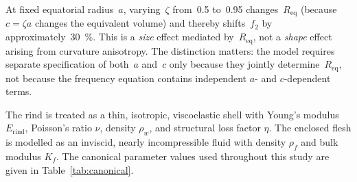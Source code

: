 At fixed equatorial radius~$a$, varying~$\zeta$ from~0.5 to~0.95
changes~$R_{\mathrm{eq}}$ (because $c = \zeta a$ changes the
equivalent volume) and thereby shifts~$f_2$ by
approximately~\SI{30}{\percent}.  This is a \emph{size} effect
mediated by~$R_{\mathrm{eq}}$, not a \emph{shape} effect arising
from curvature anisotropy.  The distinction matters: the model
requires separate specification of both~$a$ and~$c$ only because
they jointly determine~$R_{\mathrm{eq}}$, not because the frequency
equation contains independent $a$- and $c$-dependent terms.

The rind is treated as a thin, isotropic, viscoelastic shell with Young's
modulus $E_{\mathrm{rind}}$, Poisson's ratio $\nu$, density
$\rho_w$, and structural loss factor $\eta$.  The enclosed flesh is
modelled as an inviscid, nearly incompressible fluid with density
$\rho_f$ and bulk modulus $K_f$.  The canonical parameter values used
throughout this study are given in Table~\ref{tab:canonical}.

